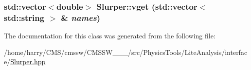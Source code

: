 \hypertarget{classSlurper_a11}{
\subsubsection[vget]{\setlength{\rightskip}{0pt plus 5cm}std::vector$<$double$>$ Slurper::vget (std::vector$<$ std::string $>$ \& {\em names})}}
\label{classSlurper_a11}




The documentation for this class was generated from the following file:\begin{CompactItemize}
\item 
/home/harry/CMS/cmssw/CMSSW\_\_\_/src/Physics\-Tools/Lite\-Analysis/interface/\hyperlink{Slurper_8hpp}{Slurper.hpp}\end{CompactItemize}
